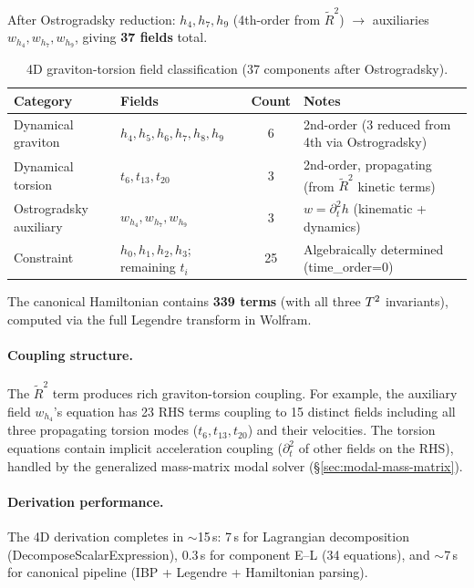 After Ostrogradsky reduction: $h_4, h_7, h_9$ (4th-order from $\tilde{R}^2$) $\to$ auxiliaries $w_{h_4}, w_{h_7}, w_{h_9}$, giving \textbf{37 fields} total.

\begin{table}[htbp]
\centering
\caption{4D graviton-torsion field classification (37 components after Ostrogradsky).}
\label{tab:torsion-4d-fields}
\begin{tabular}{@{}llcl@{}}
\toprule
Category & Fields & Count & Notes \\
\midrule
Dynamical graviton & $h_4, h_5, h_6, h_7, h_8, h_9$ & 6 & 2nd-order (3 reduced from 4th via Ostrogradsky) \\
Dynamical torsion & $t_6, t_{13}, t_{20}$ & 3 & 2nd-order, propagating (from $\tilde{R}^2$ kinetic terms) \\
Ostrogradsky auxiliary & $w_{h_4}, w_{h_7}, w_{h_9}$ & 3 & $w = \partial_t^2 h$ (kinematic + dynamics) \\
Constraint & $h_0, h_1, h_2, h_3$; remaining $t_i$ & 25 & Algebraically determined (time\_order=0) \\
\bottomrule
\end{tabular}
\end{table}

The canonical Hamiltonian contains \textbf{339 terms} (with all three $T^2$ invariants), computed via the full Legendre transform in Wolfram.

\paragraph{Coupling structure.}
The $\tilde{R}^2$ term produces rich graviton-torsion coupling.  For example, the auxiliary field $w_{h_4}$'s equation has 23 RHS terms coupling to 15 distinct fields including all three propagating torsion modes ($t_6, t_{13}, t_{20}$) and their velocities.  The torsion equations contain implicit acceleration coupling ($\partial_t^2$ of other fields on the RHS), handled by the generalized mass-matrix modal solver (\S\ref{sec:modal-mass-matrix}).

\paragraph{Derivation performance.}
The 4D derivation completes in $\sim$15\,s: 7\,s for Lagrangian decomposition (DecomposeScalarExpression), 0.3\,s for component E--L (34 equations), and $\sim$7\,s for canonical pipeline (IBP + Legendre + Hamiltonian parsing).

